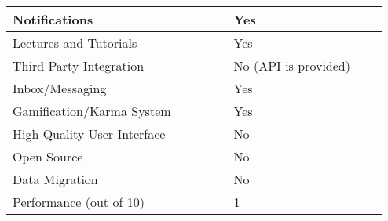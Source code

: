 \begin{table}[ht]
{\begin{tabular}{llllllll}
    \multicolumn{1}{|l|}{Notifications}               & \multicolumn{1}{l|}{} & \multicolumn{1}{l|}{} & \multicolumn{1}{l|}{} & \multicolumn{1}{l|}{} & \multicolumn{1}{l|}{Yes}                       & \multicolumn{1}{l|}{} & \multicolumn{1}{l|}{} \\ \hline
    \multicolumn{1}{|l|}{Lectures and Tutorials}      & \multicolumn{1}{l|}{} & \multicolumn{1}{l|}{} & \multicolumn{1}{l|}{} & \multicolumn{1}{l|}{} & \multicolumn{1}{l|}{Yes}                       & \multicolumn{1}{l|}{} & \multicolumn{1}{l|}{} \\ \hline
    \multicolumn{1}{|l|}{Third Party Integration}     & \multicolumn{1}{l|}{} & \multicolumn{1}{l|}{} & \multicolumn{1}{l|}{} & \multicolumn{1}{l|}{} & \multicolumn{1}{l|}{No (API is provided)}      & \multicolumn{1}{l|}{} & \multicolumn{1}{l|}{} \\ \hline
    \multicolumn{1}{|l|}{Inbox/Messaging}             & \multicolumn{1}{l|}{} & \multicolumn{1}{l|}{} & \multicolumn{1}{l|}{} & \multicolumn{1}{l|}{} & \multicolumn{1}{l|}{Yes}                       & \multicolumn{1}{l|}{} & \multicolumn{1}{l|}{} \\ \hline
    \multicolumn{1}{|l|}{Gamification/Karma System}   & \multicolumn{1}{l|}{} & \multicolumn{1}{l|}{} & \multicolumn{1}{l|}{} & \multicolumn{1}{l|}{} & \multicolumn{1}{l|}{Yes}                       & \multicolumn{1}{l|}{} & \multicolumn{1}{l|}{} \\ \hline
    \multicolumn{1}{|l|}{High Quality User Interface} & \multicolumn{1}{l|}{} & \multicolumn{1}{l|}{} & \multicolumn{1}{l|}{} & \multicolumn{1}{l|}{} & \multicolumn{1}{l|}{No}                        & \multicolumn{1}{l|}{} & \multicolumn{1}{l|}{} \\ \hline
    \multicolumn{1}{|l|}{Open Source}                 & \multicolumn{1}{l|}{} & \multicolumn{1}{l|}{} & \multicolumn{1}{l|}{} & \multicolumn{1}{l|}{} & \multicolumn{1}{l|}{No}                        & \multicolumn{1}{l|}{} & \multicolumn{1}{l|}{} \\ \hline
    \multicolumn{1}{|l|}{Data Migration}              & \multicolumn{1}{l|}{} & \multicolumn{1}{l|}{} & \multicolumn{1}{l|}{} & \multicolumn{1}{l|}{} & \multicolumn{1}{l|}{No}                        & \multicolumn{1}{l|}{} & \multicolumn{1}{l|}{} \\ \hline
    Performance (out of 10)                           &                       &                       &                       &                       & 1                                              &                       &                       \\ \hline
    \end{tabular}}
    \end{table}
